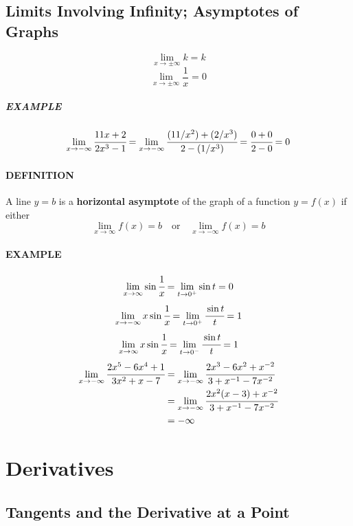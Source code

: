 \documentclass{article}
\begin{document}
            \subsection{Limits Involving Infinity; Asymptotes of Graphs}
                \[\lim\limits_{x\to \pm \infty}k=k\]
                \[\lim\limits_{x\to \pm \infty}\frac{1}{x}=0\]                    
                \subparagraph{EXAMPLE}
                \[\lim\limits_{x\to -\infty}\cfrac{11x+2}{2x^3-1}
                =\lim\limits_{x\to -\infty}\cfrac{(11/x^2)+(2/x^3)}{2-(1/x^3)}=\cfrac{0+0}{2-0}=0\]
                \paragraph{DEFINITION} A line $y=b$ is a \textbf{horizontal asymptote} of the graph of a function $y=f(x)$ if either
                \[\lim\limits_{x\to \infty}f(x)=b\quad\text{or}\quad\lim\limits_{x\to -\infty}f(x)=b\]
                \paragraph{EXAMPLE}
                \[\lim\limits_{x\to \infty}\sin\cfrac{1}{x}=\lim\limits_{t\to 0^+}\sin t=0\]
                \[\lim\limits_{x\to -\infty}x\sin \cfrac{1}{x}=\lim\limits_{t\to 0^+}\cfrac{\sin t}{t}=1\]
                \[\lim\limits_{x\to \infty}x\sin \cfrac{1}{x}=\lim\limits_{t\to 0^-}\cfrac{\sin t}{t}=1\]
                \begin{equation}
                    \begin{aligned}
                        \lim\limits_{x\to -\infty}\cfrac{2x^5-6x^4+1}{3x^2+x-7}
                        &=\lim\limits_{x\to -\infty}\cfrac{2x^3-6x^2+x^{-2}}{3+x^{-1}-7x^{-2}}\\
                        &=\lim\limits_{x\to -\infty}\cfrac{2x^2(x-3)+x^{-2}}{3+x^{-1}-7x^{-2}}\\
                        &=-\infty
                    \end{aligned}
                \end{equation}

    \newpage
    \section{Derivatives}
        \subsection{Tangents and the Derivative at a Point}
\end{document}
